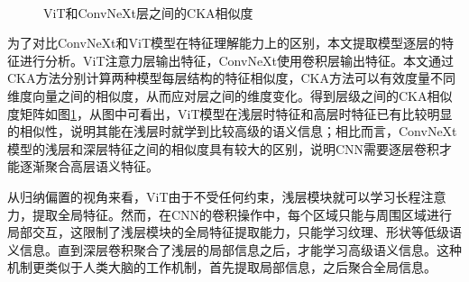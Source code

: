 \begin{figure}[H]
    \centering
    \\
     \caption{ViT和ConvNeXt层之间的CKA相似度}
    \label{fig:layer-smi}
\end{figure}

为了对比ConvNeXt和ViT模型在特征理解能力上的区别，本文提取模型逐层的特征进行分析。ViT注意力层输出特征，ConvNeXt使用卷积层输出特征。本文通过CKA方法分别计算两种模型每层结构的特征相似度，CKA方法可以有效度量不同维度向量之间的相似度，从而应对层之间的维度变化。得到层级之间的CKA相似度矩阵如图\ref{fig:layer-smi}，从图中可看出，ViT模型在浅层时特征和高层时特征已有比较明显的相似性，说明其能在浅层时就学到比较高级的语义信息；相比而言，ConvNeXt模型的浅层和深层特征之间的相似度具有较大的区别，说明CNN需要逐层卷积才能逐渐聚合高层语义特征。

从归纳偏置的视角来看，ViT由于不受任何约束，浅层模块就可以学习长程注意力，提取全局特征。然而，在CNN的卷积操作中，每个区域只能与周围区域进行局部交互，这限制了浅层模块的全局特征提取能力，只能学习纹理、形状等低级语义信息。直到深层卷积聚合了浅层的局部信息之后，才能学习高级语义信息。这种机制更类似于人类大脑的工作机制，首先提取局部信息，之后聚合全局信息。

